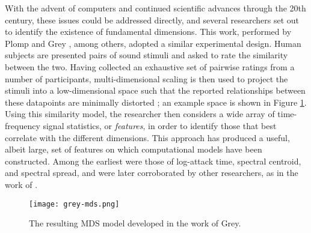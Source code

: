 With the advent of computers and continued scientific advances through the 20th century, these issues could be addressed directly, and several researchers set out to identify the existence of fundamental dimensions.
This work, performed by Plomp \cite{Plomp1976Aspects} and Grey \cite{Grey1977Multidimensional}, among others, adopted a similar experimental design.
Human subjects are presented pairs of sound stimuli and asked to rate the similarity between the two.
Having collected an exhaustive set of pairwise ratings from a number of participants, multi-dimensional scaling is then used to project the stimuli into a low-dimensional space such that the reported relationships between these datapoints are minimally distorted \cite{Grey1977Multidimensional}; an example space is shown in Figure \ref{fig:grey_mds}.
Using this similarity model, the researcher then considers a wide array of time-frequency signal statistics, or \emph{features}, in order to identify those that best correlate with the different dimensions.
This approach has produced a useful, albeit large, set of features on which computational models have been constructed.
Among the earliest were those of log-attack time, spectral centroid, and spectral spread, and were later corroborated by other researchers, as in the work of \cite{McAdams1995Perceptual}.

\begin{figure}[t]
\centering
\texttt{[image: grey-mds.png]}
\caption{The resulting MDS model developed in the work of Grey.}
\label{fig:grey_mds}
\end{figure}


